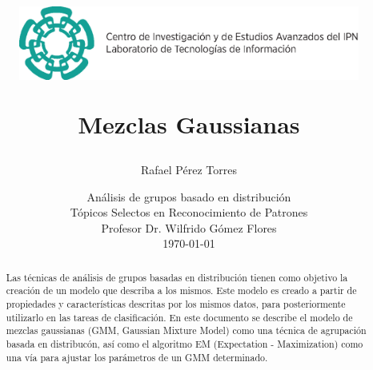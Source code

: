\documentclass[a4paper]{article}
\begin{document}
	\title{
	\begin{figure}[!ht]
		\flushleft
			\includegraphics[width=\textwidth]{resources/images/cinvestav-header}
	\end{figure}
	\vspace{1cm}
	\Huge Mezclas Gaussianas
	}
	
	\vspace{1cm}
	
	\author{Rafael Pérez Torres}	
	
	
	\date{
	\large Análisis de grupos basado en distribución \\ Tópicos Selectos en Reconocimiento de Patrones \\ 
	\vspace{0.8cm}
	\large Profesor Dr. Wilfrido Gómez Flores \\
	\vspace{1cm}
	\today
	}

	\maketitle
	\setlength{\parindent}{0pt}

\vspace{2cm}
\begin{abstract}
Las técnicas de análisis de grupos basadas en distribución tienen como objetivo la creación de un modelo que describa a los mismos.
Este modelo es creado a partir de propiedades y características descritas por los mismos datos, para posteriormente utilizarlo en las tareas de clasificación.
En este documento se describe el modelo de mezclas gaussianas (GMM, Gaussian Mixture Model) como una técnica de agrupación basada en distribucón, así como el algoritmo EM (Expectation - Maximization) como una vía para ajustar los parámetros de un GMM determinado.

\end{abstract}
	\newpage
	\tableofcontents
	\newpage
	
\end{document}
